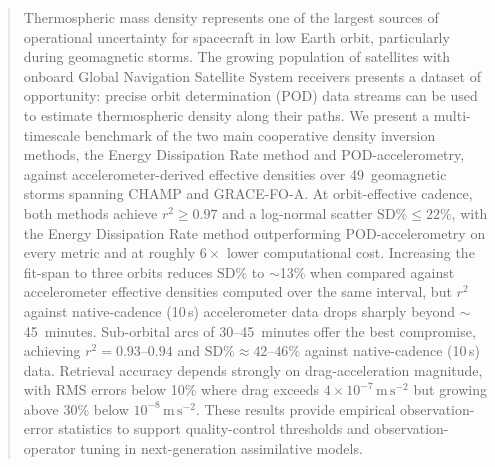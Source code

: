 \documentclass{agujournal2019}
\begin{document}
\begin{abstract}
Thermospheric mass density represents one of the largest sources of operational uncertainty for spacecraft in low Earth orbit, particularly during geomagnetic storms. The growing population of satellites with onboard Global Navigation Satellite System receivers presents a dataset of opportunity: precise orbit determination (POD) data streams can be used to estimate thermospheric density along their paths. We present a multi-timescale benchmark of the two main cooperative density inversion methods, the Energy Dissipation Rate method and POD-accelerometry, against accelerometer-derived effective densities over 49~geomagnetic storms spanning CHAMP and GRACE-FO-A. At orbit-effective cadence, both methods achieve $r^{2} \geq 0.97$ and a log-normal scatter $\text{SD\%} \leq 22\%$, with the Energy Dissipation Rate method outperforming POD-accelerometry on every metric and at roughly $6\times$ lower computational cost. Increasing the fit-span to three orbits reduces $\text{SD\%}$ to $\sim$13\% when compared against accelerometer effective densities computed over the same interval, but $r^{2}$ against native-cadence (10\,s) accelerometer data drops sharply beyond $\sim$45~minutes. Sub-orbital arcs of 30--45~minutes offer the best compromise, achieving $r^{2} = 0.93$--$0.94$ and $\text{SD\%} \approx 42$--$46\%$ against native-cadence (10\,s) data. Retrieval accuracy depends strongly on drag-acceleration magnitude, with RMS errors below 10\% where drag exceeds $4 \times 10^{-7}\,\mathrm{m\,s^{-2}}$ but growing above 30\% below $10^{-8}\,\mathrm{m\,s^{-2}}$. These results provide empirical observation-error statistics to support quality-control thresholds and observation-operator tuning in next-generation assimilative models.
\end{abstract}
\end{document}
